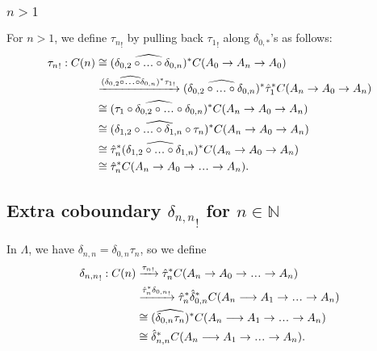 \subsubsection{$n>1$}
For $n>1$, we define ${\tau_n}_!$ by 
pulling back ${\tau_1}_!$ along $\delta_{0,*}$'s 
as follows:
\begin{align*}
{\tau_n}_!: C(n) 
&\cong 
(\widehat{\delta_{0,2}\circ\smdots\circ\delta_{0,n}})^*
  C(A_0 \to A_n \to A_0)\\
&\xrightarrow{
  (\widehat{\delta_{0,2}\circ\smdots\circ\delta_{0,n}})^*
  {\tau_1}_!}
(\widehat{\delta_{0,2}\circ\smdots\circ\delta_{0,n}})^*
  \hat{\tau}_1^*C(A_n \to A_0 \to A_n)\\
&\cong
(\widehat{\tau_1\circ\delta_{0,2}\circ\smdots\circ
  \delta_{0,n}})^*C(A_n \to A_0 \to A_n)\\
&\cong
(\widehat{\delta_{1,2}\circ\smdots\circ\delta_{1,n}
  \circ \tau_n})^*C(A_n \to A_0 \to A_n)\\
&\cong
\hat{\tau}_n^*
  (\widehat{\delta_{1,2}\circ\smdots\circ\delta_{1,n}})^*
  C(A_n \to A_0 \to A_n)\\
&\cong 
\hat{\tau}_n^*C(A_n \to A_0 \to \smdots \to A_n).  
\end{align*}
%
\subsection{Extra coboundary 
  ${\delta_{n,n}}_!$ for 
  $n \in \mathbb{N}$}
In $\Lambda$, we have $\delta_{n,n} = 
\delta_{0,n}\tau_n$, so we define 
\begin{align*}
{{\delta}_{n,n}}_! : C(n)
& \xrightarrow{{\tau_n}_!}
\hat{\tau}_n^*
  C(A_n \to A_0 \to \smdots \to A_n)\\
& \xrightarrow{\hat{\tau}_n^*{\delta_{0,n}}_!}
\hat{\tau}_n^*\hat{\delta}_{0,n}^*
  C(A_n \longrightarrow A_1 \to \smdots \to A_n) \\
&\cong
(\widehat{\delta_{0,n}\tau_n})^*
  C(A_n \longrightarrow A_1 \to \smdots \to A_n)\\
&\cong
\hat{\delta}_{n,n}^*
C(A_n \longrightarrow A_1 \to \smdots \to A_n).
\end{align*}
%
